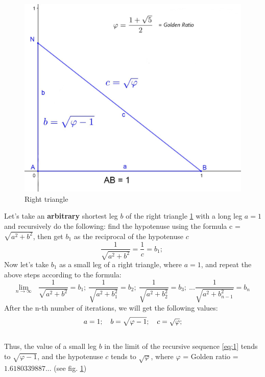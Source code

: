 \documentclass[12pt, letterpaper, oneside]{report}
\begin{document}
\begin{figure}[h]
	\centering
	\includegraphics[width=0.7\linewidth]{images/phi-triangle.jpg}
	\caption{Right triangle}
	\label{fig:phi-triangle}
\end{figure}
\par Let's take an \textbf{arbitrary} shortest leg $b$ of the right triangle \ref{fig:phi-triangle} with a long leg $a=1$ and recursively do the following: find the hypotenuse using the formula {c }=$\sqrt{a^2+b^2}$, then get $ b_{1 }$ as the reciprocal of the hypotenuse $c$
\begin{equation}
\dfrac{1}{\sqrt{a^2+b^2}} = \dfrac{1}{c} = b_{1}; \   
\end{equation} 
Now let's take $b_{1}$ as a small leg of a right triangle, where $a=1$, and repeat the above steps according to the formula:
\begin{equation}
\lim_{n\to\infty}\ \ \ \dfrac{1}{\sqrt{a^2+b^2}} = b_{1}; \   \dfrac{1}{\sqrt{a^2+b_{1}^2}} = b_{2}; \   \dfrac{1}{\sqrt{a^2+b_{2}^2}}=b_{3}; \ ... \dfrac{1}{\sqrt{a^2+b_{n-1}^2}}=b_{n}\ \label{eq:1}
\end{equation} 
After the n-th number of iterations, we will get the following values:
\begin{equation}
a=1; \ \ \ \ 
\\
b=\sqrt{\varphi-1}; \ \ \ \ 
\\
c=\sqrt{\varphi};
\end{equation}
\\
Thus, the value of a small leg $b$ in the limit of the recursive sequence \ref{eq:1} tends to $\sqrt{\varphi-1}$, and the hypotenuse ${c}$ tends to $\sqrt{ \varphi}$, where $\varphi $ = Golden ratio = $1.6180339887...$ (see fig. \ref{fig:phi-triangle})
\\
 
\end{document}
